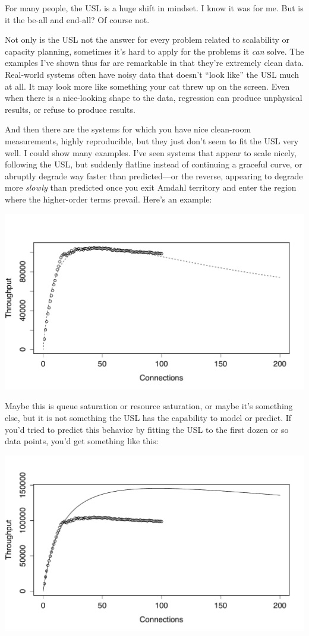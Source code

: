 \documentclass{vivid_layout}
\begin{document}
For many people, the USL is a huge shift in mindset. I know it was for me. But
is it the be-all and end-all? Of course not.

Not only is the USL not the answer for every problem related to scalability
or capacity planning, sometimes it's hard to apply for the problems it
{\itshape can} solve. The examples I've shown thus far are remarkable in that
they're extremely clean data. Real-world systems often have noisy data that
doesn't ``look like'' the USL much at all. It may look more like something your
cat threw up on the screen. Even when there is a nice-looking shape to the data,
regression can produce unphysical results, or refuse to produce results.

And then there are the systems for which you have nice clean-room measurements,
highly reproducible, but they just don't seem to fit the USL very well. I could show
many examples. I've seen systems that appear to scale nicely, following the USL,
but suddenly flatline instead of continuing a graceful curve, or abruptly
degrade way faster than predicted---or the reverse, appearing to degrade more
{\itshape slowly} than predicted once you exit Amdahl territory and enter the
region where the higher-order terms prevail.  Here's an example:
\begin{center}
\includegraphics[width=.85\linewidth]{scalability/handlersocket}
\end{center}

Maybe this is queue saturation or resource saturation, or maybe it's something
else, but it is not something the USL has the capability to model or predict. If
you'd tried to predict this behavior by fitting the USL to the first dozen or so
data points, you'd get something like this:
\begin{center}
\includegraphics[width=.85\linewidth]{scalability/handlersocket-2}
\end{center}
\end{document}
